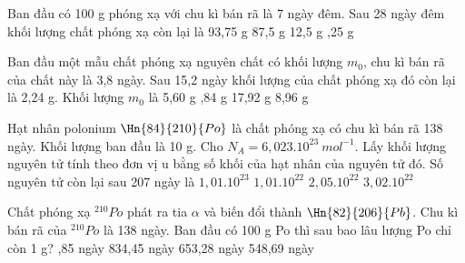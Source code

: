 
\begin{vidu}%
Ban đầu có 100 g phóng xạ với chu kì bán rã là 7 ngày đêm. Sau 28 ngày đêm khối lượng chất phóng xạ còn lại là
\choice
{93,75 g}
{87,5 g}
{12,5 g}
{,25 g}
\end{vidu}
\begin{vidu}%
Ban đầu một mẫu chất phóng xạ nguyên chất có khối lượng $m_0$, chu kì bán rã của chất này là 3,8 ngày. Sau 15,2 ngày khối lượng của chất phóng xạ đó còn lại là 2,24 g. Khối lượng $m_0$ là
\choice
{5,60 g}
{,84 g}
{17,92 g}
{8,96 g}
\end{vidu}
\begin{vidu}%
Hạt nhân polonium $\Hn{84}{210}{Po}$ là chất phóng xạ có chu kì bán rã 138 ngày. Khối lượng ban đầu là 10 g. Cho $N_A = 6,023.10^{23}\ mol^{-1}$.  Lấy khối lượng nguyên tử tính theo đơn vị u bằng số khối của hạt nhân của nguyên tử đó. Số nguyên tử còn lại sau 207 ngày là
\choice
{$1,01.10^{23}$}
{\True $1,01.10^{22}$}
{$2,05.10^{22}$}
{$3,02.10^{22}$}
\end{vidu}
\begin{vidu}%
Chất phóng xạ $^{210}Po$ phát ra tia $\alpha$ và biến đổi thành $\Hn{82}{206}{Pb}$. Chu kì bán rã của $^{210}Po$  là 138 ngày. Ban đầu có 100 g Po thì sau bao lâu lượng Po chỉ còn 1 g?
\choice
{,85 ngày}
{834,45 ngày}
{653,28 ngày}
{548,69 ngày}	
\end{vidu}
